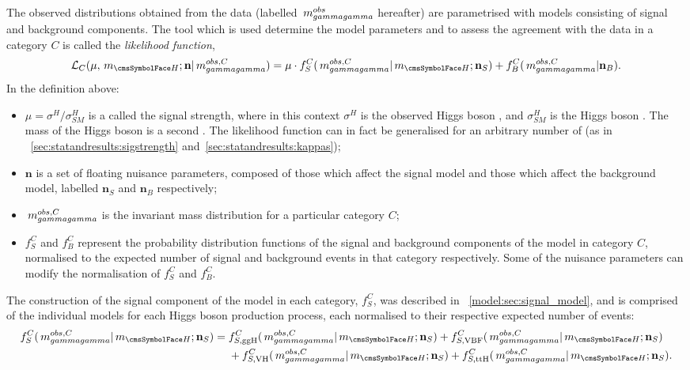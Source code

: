 The observed \mgg distributions obtained from the data (labelled $ \,m_{gammagamma}^{obs}$ hereafter) are parametrised with models consisting of signal and background components. The tool which is used determine the model parameters and to assess the agreement with the data in a category $C$ is called the \emph{likelihood function},
\begin{equation}
\label{eq:statandresults:likelihood_function}
\mathcal{L}_C(\mu, \mH; \mathbf{n} | \mgg^{obs,C} ) = \mu \cdot f^C_S(\mgg^{obs,C} |\mH; \mathbf{n}_S) + f^C_B(\mgg^{obs,C} | \mathbf{n}_B ). 
\end{equation}
In the definition above:
\begin{itemize}
\item $\mu = \sigma^{H} / \sigma^{H}_{SM}$ is a \POI called the signal strength, where in this context $\sigma^H$ is the observed Higgs boson \crosssection, and $\sigma^H_{SM}$ is the \SM Higgs boson \crosssection. The mass of the Higgs boson \mH is a second \POI. The likelihood function can in fact be generalised for an arbitrary number of \POI\s (as in \Sec\s~\ref{sec:statandresults:sigstrength} and~\ref{sec:statandresults:kappas}); 
\item $\mathbf{n}$ is a set of floating nuisance parameters, composed of those which affect the signal model and those which affect the background model, labelled $\mathbf{n}_S$ and $\mathbf{n}_B$ respectively;
\item $\,m_{gammagamma}^{obs,C}$ is the invariant mass distribution for a particular category $C$;
\item $f^C_S$ and $f^C_B$ represent the probability distribution functions of the signal and background components of the model in category $C$, normalised to the expected number of signal and background events in that category respectively. Some of the nuisance parameters can modify the normalisation of $f^C_S$ and $f^C_B$. 
\end{itemize}

The construction of the signal component of the model in each category, $f^C_S$, was described in \Sec~\ref{model:sec:signal_model}, and is comprised of the individual models for each Higgs boson production process, each normalised to their respective expected number of events:
\begin{equation}
\label{eq:statandresults:f_s_breakdown}
\begin{split}
 f^C_S(\mgg^{obs,C} |\mH; \mathbf{n}_S) ={} & f^C_{S,{\text{ggH}}}(\mgg^{obs,C} |\mH; \mathbf{n}_S)  + f^C_{S,{\text{VBF}}}(\mgg^{obs,C} |\mH; \mathbf{n}_S)\\
  & + f^C_{S,{\text{VH}}}(\mgg^{obs,C} |\mH; \mathbf{n}_S)+ f^C_{S,{\text{ttH}}}(\mgg^{obs,C} |\mH; \mathbf{n}_S).\\
\end{split}
\end{equation}

